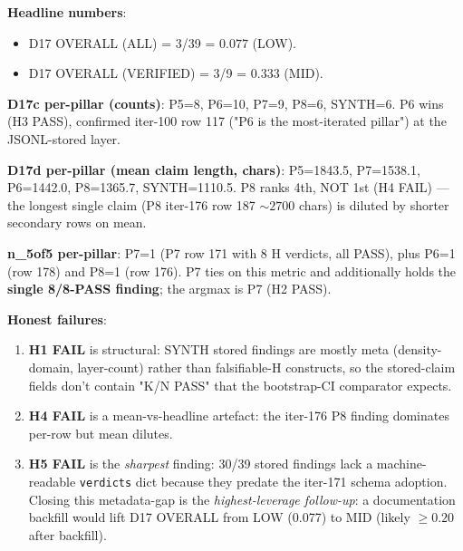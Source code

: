 \textbf{Headline numbers}:
\begin{itemize}
\item D17 OVERALL (ALL) = 3/39 = $0.077$ (LOW).
\item D17 OVERALL (VERIFIED) = 3/9 = $0.333$ (MID).
\end{itemize}

\textbf{D17c per-pillar (counts)}: P5=8, P6=10, P7=9, P8=6,
SYNTH=6. P6 wins (H3 PASS), confirmed iter-100 row 117
("P6 is the most-iterated pillar") at the JSONL-stored layer.

\textbf{D17d per-pillar (mean claim length, chars)}:
P5=1843.5, P7=1538.1, P6=1442.0, P8=1365.7, SYNTH=1110.5. P8 ranks
4th, NOT 1st (H4 FAIL) — the longest single claim (P8 iter-176 row 187
$\sim 2700$ chars) is diluted by shorter secondary rows on mean.

\textbf{n\_5of5 per-pillar}: P7=1 (P7 row 171 with 8 H verdicts, all
PASS), plus P6=1 (row 178) and P8=1 (row 176). P7 ties on this metric
and additionally holds the \textbf{single 8/8-PASS finding}; the
argmax is P7 (H2 PASS).

\textbf{Honest failures}:
\begin{enumerate}
\item \textbf{H1 FAIL} is structural: SYNTH stored findings are
  mostly meta (density-domain, layer-count) rather than
  falsifiable-H constructs, so the stored-claim fields don't contain
  "K/N PASS" that the bootstrap-CI comparator expects.
\item \textbf{H4 FAIL} is a mean-vs-headline artefact: the
  iter-176 P8 finding dominates per-row but mean dilutes.
\item \textbf{H5 FAIL} is the \emph{sharpest} finding: 30/39 stored
  findings lack a machine-readable \texttt{verdicts} dict because
  they predate the iter-171 schema adoption. Closing this
  metadata-gap is the \emph{highest-leverage follow-up}: a
  documentation backfill would lift D17 OVERALL from LOW (0.077)
  to MID (likely $\ge 0.20$ after backfill).
\end{enumerate}

